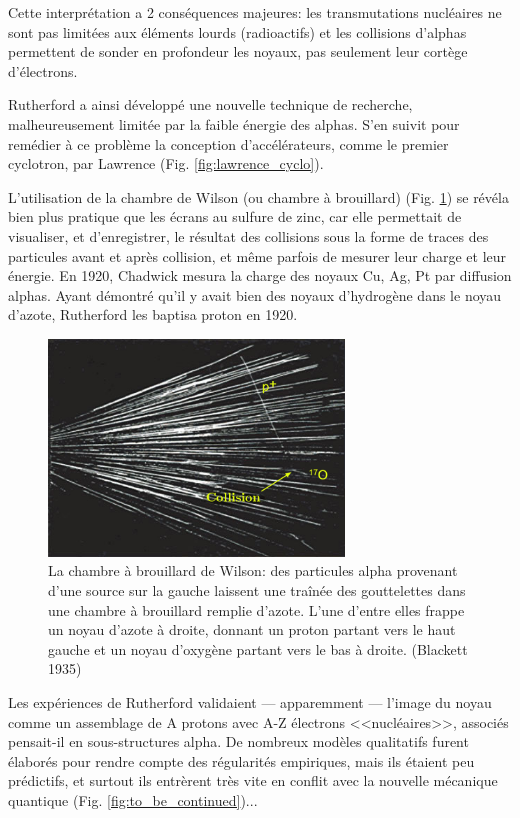Cette interprétation a 2 conséquences majeures: les transmutations nucléaires ne sont pas limitées aux éléments lourds (radioactifs) et les collisions d'alphas permettent de sonder en profondeur les noyaux, pas seulement leur cortège d'électrons.

Rutherford a ainsi développé une nouvelle technique de recherche, malheureusement limitée par la faible énergie des alphas. S'en suivit pour remédier à ce problème la conception d'accélérateurs, comme le premier cyclotron, par Lawrence (Fig. \ref{fig:lawrence_cyclo}).

L’utilisation de la chambre de Wilson (ou chambre à brouillard) (Fig. \ref{fig:chambre_wilson}) se révéla bien plus pratique que les écrans au sulfure de zinc, car elle permettait de visualiser, et d’enregistrer, le résultat des collisions sous la forme de traces des particules avant et après collision, et même parfois de mesurer leur charge et leur énergie. En 1920, Chadwick mesura la charge des noyaux Cu, Ag, Pt par diffusion alphas. Ayant démontré qu’il y avait bien des noyaux d’hydrogène dans le noyau d’azote, Rutherford les baptisa proton en 1920.

\begin{figure}[ht]
    \centering
    \includegraphics[width=0.7\textwidth]{Images1/collisions_alpha_proton.jpg}
    \caption{La chambre à brouillard de Wilson: des particules alpha provenant d'une source sur la gauche laissent une traînée des gouttelettes dans une chambre à brouillard remplie d'azote. L'une d'entre elles frappe un noyau d'azote à droite, donnant un proton partant vers le haut gauche et un noyau d'oxygène partant vers le bas à droite. (Blackett 1935)}
    \label{fig:chambre_wilson}
\end{figure}

Les expériences de Rutherford validaient --- apparemment --- l’image du noyau comme un assemblage de A protons avec A-Z électrons <<nucléaires>>, associés pensait-il en sous-structures alpha. De nombreux modèles qualitatifs furent élaborés pour rendre compte des régularités empiriques, mais ils étaient peu prédictifs, et surtout ils entrèrent très vite en conflit avec la nouvelle mécanique quantique (Fig. \ref{fig:to_be_continued})...

